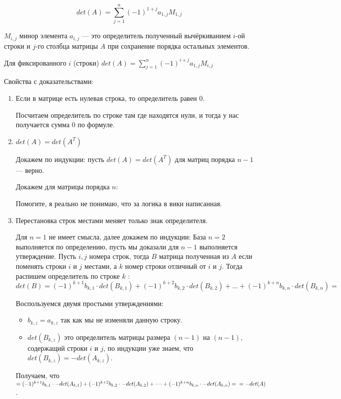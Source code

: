 $$\displaystyle det(A) = \sum _{j=1}^{n}(-1)^{1+j}a_{1, j} {M}_{1, j}$$

$M_{i, j}$ минор элемента $a_{i, j}$ --- это определитель полученный вычёркиванием $i$-ой строки и $j$-го столбца матрицы $A$ при сохранение порядка остальных элементов.

Для фиксированного $i$ (строки) $\displaystyle det(A) = \sum _{j=1}^{n}(-1)^{i+j}a_{1, j} {M}_{i, j}$

Свойства с доказательствами:

\begin{enumerate}
	\item Если в матрице есть нулевая строка, то определитель равен $0$.
	
	Посчитаем определитель по строке там где находятся нули, и тогда у нас получается сумма $0$ по формуле. 
	
	\item $det(A) = det(A^{T})$
	
	Докажем по индукции: пусть $det(A) = det(A^T)$ для матриц порядка $n - 1$ --- верно.
	
	Докажем для матрицы порядка $n$:
	
	Помогите, я реально не понимаю, что за логика в вики написанная. 
	
	\item Перестановка строк местами меняет только знак определителя.
	
	Для $n=1$ не имеет смысла, далее докажем по индукции: База $n=2$ выполняется по определению, пусть мы доказали для $n-1$ выполняется утверждение. Пусть $i, j$ номера строк, тогда $B$ матрица полученная из $A$ если поменять строки $i$ и $j$ местами, а $k$ номер строки отличный от $i$ и $j$. Тогда распишем определитель по строке $k$ : $det(B) = (-1) ^ {k + 1} b_{k, 1} \cdot det(B_{k, 1}) + (-1) ^ {k + 2} b_{k, 2} \cdot det(B_{k, 2}) + \dots + (-1) ^ {k + n} b_{k, n} \cdot det(B_{k, n}) = $
	
	Воспользуемся двумя простыми утверждениями:
	
	\begin{itemize}
		\item $b_{k, z} = a_{k, z}$ так как мы не изменяли данную строку.
		\item $det(B_{k, z})$ это определитель матрицы размера $(n - 1)$ на $(n - 1)$,  содержащий строки $i$ и $j$, по индукции уже знаем, что $det(B_{k, z}) = -det(A_{k, z})$. 
	\end{itemize}

	Получаем, что $= (-1) ^ {k + 1} b_{k, 1} \cdot -det(A_{k, 1}) + (-1) ^ {k + 2} b_{k, 2} \cdot -det(A_{k, 2}) + \dots + (-1) ^ {k + n} b_{k, n} \cdot -det(A_{k, n}) = \\ = -det(A)$.
	

\end{enumerate}
